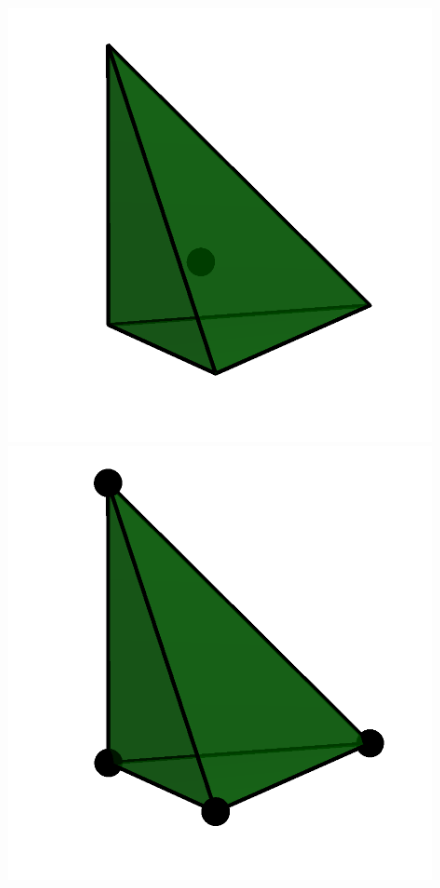 \begin{figure}
  \includegraphics[width=\fourfigs]{chapters/kirby-6/png/DG0_3d.png}
  \includegraphics[width=\fourfigs]{chapters/kirby-6/png/DG1_3d.png}

\end{figure}
